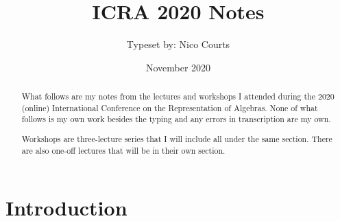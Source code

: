 \documentclass{article}
\title{ICRA 2020 Notes}
\author{Typeset by: Nico Courts}
\date{November 2020}
\begin{document}
\maketitle
\begin{abstract}
    What follows are my notes from the lectures and workshops I attended during the 2020 (online) International Conference on the Representation of Algebras. None of what follows is my own work besides the typing and any errors in transcription are my own.
    
    Workshops are three-lecture series that I will include all under the same section. There are also one-off lectures that will be in their own section.
\end{abstract}
\section{Introduction}
\end{document}
